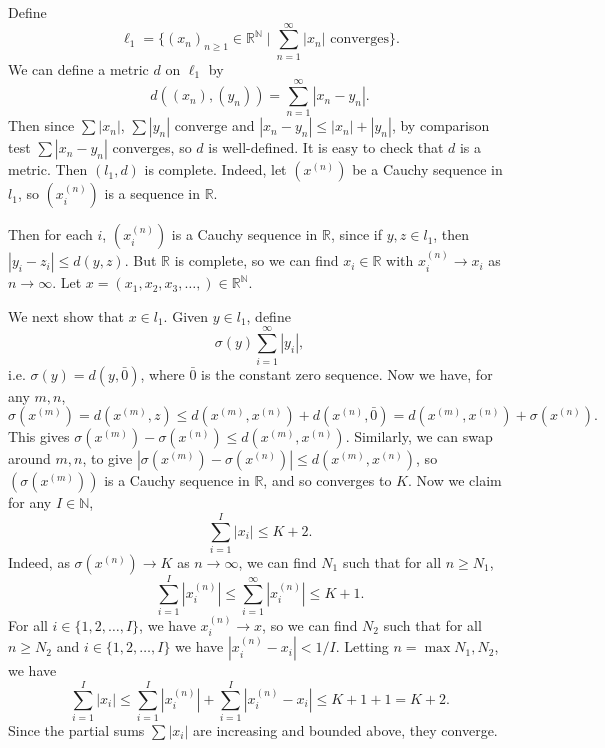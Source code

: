 \documentclass[12pt]{article}
\begin{document}
\begin{exbox}
	Define
	\[
		\ell_1 = \biggl\{(x_n)_{n \geq 1} \in \mathbb{R}^{\mathbb{N}} \mid \sum_{n = 1}^{\infty} |x_n| \text{ converges} \biggr\}
	.\]
	We can define a metric $d$ on $\ell_1$ by
	\[
		d((x_n), (y_n)) = \sum_{n = 1}^{\infty} |x_n - y_n|
	.\]
	Then since $\sum |x_n|$, $\sum |y_n|$ converge and $|x_n - y_n| \leq |x_n| + |y_n|$, by comparison test $\sum |x_n - y_n|$ converges, so $d$ is well-defined. It is easy to check that $d$ is a metric. Then $(l_1, d)$ is complete. Indeed, let $(x^{(n)})$ be a Cauchy sequence in $l_1$, so $(x^{(n)}_i)$ is a sequence in $\mathbb{R}$.

		Then for each $i$, $(x^{(n)}_{i})$ is a Cauchy sequence in $\mathbb{R}$, since if $y, z \in l_1$, then $|y_i - z_i| \leq d(y, z)$. But $\mathbb{R}$ is complete, so we can find $x_i \in \mathbb{R}$ with $x^{(n)}_{i} \to x_i$ as $n \to \infty$. Let $x = (x_1, x_2, x_3, \ldots, ) \in \mathbb{R}^{\mathbb{N}}$.

	We next show that $x \in l_1$. Given $y \in l_1$, define
	\[
		\sigma(y) \sum_{i = 1}^{\infty} |y_i|
	,\]
	i.e. $\sigma(y) = d(y, \bar 0)$, where $\bar 0$ is the constant zero sequence. Now we have, for any $m, n$,
	\[
		\sigma(x^{(m)}) = d(x^{(m)}, z) \leq d(x^{(m)}, x^{(n)}) + d(x^{(n)}, \bar 0) = d(x^{(m)}, x^{(n)}) + \sigma(x^{(n)})
	.\]
	This gives $\sigma(x^{(m)}) - \sigma(x^{(n)}) \leq d(x^{(m)}, x^{(n)})$. Similarly, we can swap around $m, n$, to give $|\sigma(x^{(m)}) - \sigma(x^{(n)})| \leq d(x^{(m)}, x^{(n)})$, so $(\sigma(x^{(m)}))$ is a Cauchy sequence in $\mathbb{R}$, and so converges to $K$. Now we claim for any $I \in \mathbb{N}$,
	\[
	\sum_{i = 1}^{I} |x_i| \leq K + 2
	.\]
	Indeed, as $\sigma(x^{(n)}) \to K$ as $n \to \infty$, we can find $N_1$ such that for all $n \geq N_1$,
	\[
		\sum_{i = 1}^{I} |x_i^{(n)}| \leq \sum_{i = 1}^{\infty}|x^{(n)}_i| \leq K + 1
	.\]
	For all $i \in \{1, 2, \ldots, I\}$, we have $x^{(n)}_i \to x$, so we can find $N_2$ such that for all $n \geq N_2$ and $i \in \{1, 2, \ldots, I\}$ we have $|x^{(n)}_i - x_i| < 1/I$. Letting $n = \max{N_1, N_2}$, we have
	\[
		\sum_{i = 1}^{I} |x_i| \leq \sum_{i = 1}^{I} |x^{(n)}_i| + \sum_{i = 1}^{I} |x^{(n)}_i - x_i| \leq K + 1 + 1 = K + 2
	.\]
	Since the partial sums $\sum |x_i|$ are increasing and bounded above, they converge.


\end{exbox}
\end{document}

